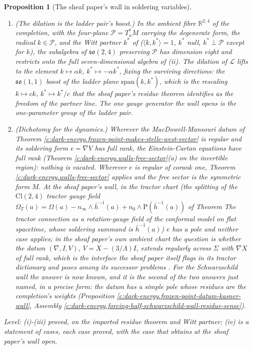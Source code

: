 \documentclass[11pt]{article}
\newtheorem{proposition}[theorem]{Proposition}
\theoremstyle{definition}
\theoremstyle{plain}
\providecommand{\Cl}{}\renewcommand{\Cl}{\mathrm{Cl}}
\providecommand{\Sch}{}\renewcommand{\Sch}{\mathrm{P}}
\providecommand{\hb}{}\renewcommand{\hb}{\bar{h}}
\providecommand{\nInf}{}\renewcommand{\nInf}{n_\infty}
\providecommand{\nO}{}\renewcommand{\nO}{n_0}
\providecommand{\ip}{}\renewcommand{\ip}[2]{\langle #1, #2\rangle}
\begin{document}
\begin{proposition}[The sheaf paper's wall in soldering variables]
\begin{enumerate}
\item[(iii)] \emph{(The dilation is the ladder pair's boost.)} In the ambient fibre $\mathbb{R}^{2,4}$ of the completion, with the four-plane $\mathcal{P} = T^*_x M$ carrying the degenerate form, the radical $k \in \mathcal{P}$, and the Witt partner $k^*$ of \cite[Cor.~4.5]{ButlerT4} ($\ip{k}{k^*} = 1$, $k^*$ null, $k^* \perp \mathcal{P}$ except for $k$), the subalgebra of $\mathfrak{so}(2,4)$ preserving $\mathcal{P}$ has dimension eight and restricts onto the full seven-dimensional algebra of (ii). The dilation of $\mathcal{L}$ lifts to the element $k \mapsto \alpha k$, $k^* \mapsto -\alpha k^*$, fixing the surviving directions: the $\mathfrak{so}(1,1)$ boost of the ladder plane $\mathrm{span}(k, k^*)$, which is the rescaling $k \mapsto ck$, $k^* \mapsto k^*/c$ that the sheaf paper's residue theorem identifies as the freedom of the partner line. The one gauge generator the wall opens is the one-parameter group of the ladder pair.
\item[(iv)] \emph{(Dichotomy for the dynamics.)} Wherever the MacDowell-Mansouri datum of Theorem \ref{c:dark-energy.frozen-point-makes-stelle-west-vector} is regular and its soldering form $e = \nabla V$ has full rank, the Einstein-Cartan equations have full rank (Theorem \ref{c:dark-energy.walls-free-sector}(a) on the invertible region): nothing is vacated. Wherever $e$ is regular of corank one, Theorem \ref{c:dark-energy.walls-free-sector} applies and the free sector is the symmetric form $M$. At the sheaf paper's wall, in the tractor chart (the splitting of the $\Cl(2,4)$ tractor gauge field $\Omega_{T}(a) = \Omega(a) - \nInf\wedge\hb^{-1}(a) + \nO\wedge\Sch(\hb^{-1}(a))$ of Theorem \emph{The tractor connection as a rotation-gauge field of the conformal model on flat spacetime}, whose soldering summand is $\hb^{-1}(a)$) $e$ has a pole and neither case applies; in the sheaf paper's own ambient chart the question is whether the datum $(\nabla, I, V)$, $V = X - (3/\Lambda)I$, extends regularly across $\Sigma$ with $\nabla X$ of full rank, which is the interface the sheaf paper itself flags in its tractor dictionary and poses among its successor problems \cite[\S 7.3-7.4]{ButlerT4}. For the Schwarzschild wall the answer is now known, and it is the second of the two answers just named, in a precise form: the datum has a simple pole whose residues are the completion's weights (Proposition \ref{c:dark-energy.frozen-point-datum-kasner-wall}, Assembly \ref{c:dark-energy.forcing-half-schwarzschild-wall-residue-sense}).
\end{enumerate}
\emph{Level:} (i)-(iii) proved, on the imported residue theorem and Witt partner; (iv) is a statement of cases, each case proved, with the case that obtains at the sheaf paper's wall open.
\end{proposition}
\end{document}
